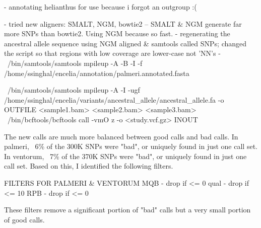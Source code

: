 \documentclass[idxtotoc,hyperref,openany,oneside]{labbook} %
\begin{document}
- annotating helianthus for use because i forgot an outgroup :(

- tried new aligners: SMALT, NGM, bowtie2 -- SMALT & NGM generate far more SNPs than bowtie2. Using NGM because so fast.
- regenerating the ancestral allele sequence using NGM aligned \& samtools called SNPs; changed the script so that regions with low coverage are lower-case not 'NN's
- ~/bin/samtools/samtools mpileup -A -B -I -f /home/ssinghal/encelia/annotation/palmeri.annotated.fasta 

~/bin/samtools/samtools mpileup -A -I -ugf /home/ssinghal/encelia/variants/ancestral_allele/ancestral_allele.fa -o OUTFILE <sample1.bam> <sample2.bam> <sample3.bam>
~/bin/bcftools/bcftools call -vmO z -o <study.vcf.gz> INOUT

The new calls are much more balanced between good calls and bad calls. In palmeri, ~6\% of the 300K SNPs were "bad", or uniquely found in just one call set. In ventorum, ~7\% of the 370K SNPs were "bad", or uniquely found in just one call set.  Based on this, I identified the following filters.

FILTERS FOR PALMERI & VENTORUM
MQB - drop if <= 0
qual - drop if <= 10
RPB - drop if <= 0

These filters remove a significant portion of "bad" calls but a very small portion of good calls.
\end{document}
